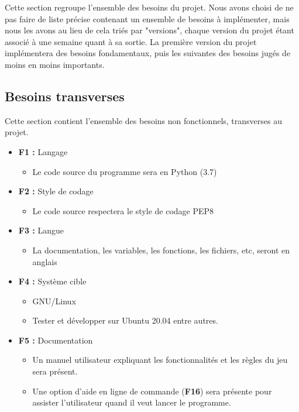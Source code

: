 \documentclass{article}
\begin{document}
Cette section regroupe l'ensemble des besoins du projet. Nous avons choisi de ne pas faire de liste précise contenant un ensemble de besoins à implémenter, mais nous les avons au lieu de cela triés par "versions", chaque version du projet étant associé à une semaine quant à sa sortie. La première version du projet implémentera des besoins fondamentaux, puis les suivantes des besoins jugés de moins en moins importants.

\subsection{Besoins transverses}

Cette section contient l'ensemble des besoins non fonctionnels, transverses au projet.

\medskip
\begin{itemize}
    \item \textbf{F1 :} Langage
    \begin{itemize}
        \item Le code source du programme sera en Python (3.7)
    \end{itemize}
    \item \textbf{F2 :} Style de codage
    \begin{itemize}
        \item Le code source respectera le style de codage PEP8
    \end{itemize}
    \item \textbf{F3 :} Langue
    \begin{itemize}
        \item La documentation, les variables, les fonctions, les fichiers, etc, seront en anglais
    \end{itemize}
    \item \textbf{F4 :} Système cible
    \begin{itemize}
        \item GNU/Linux
        \item Tester et développer sur Ubuntu 20.04 entre autres.
    \end{itemize}
    \item \textbf{F5 :} Documentation
    \begin{itemize}
        \item Un manuel utilisateur expliquant les fonctionnalités et les règles du jeu sera présent.
        \item Une option d’aide en ligne de commande (\textbf{F16}) sera présente pour assister l'utilisateur quand il veut lancer le programme.

\end{itemize}
\end{itemize}
\end{document}
